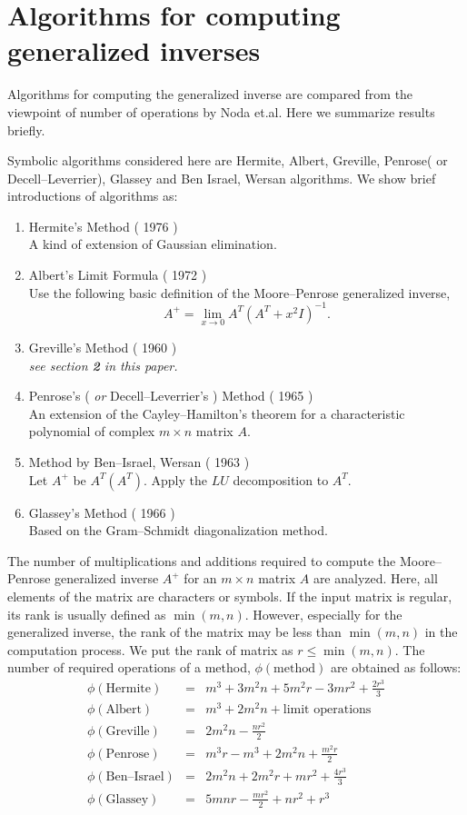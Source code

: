 \section{Algorithms for computing generalized inverses}

Algorithms for computing the generalized inverse 
are compared from the viewpoint of number of 
operations by Noda et.al. \cite{No89,MS95}  
Here we summarize results briefly.  \par
Symbolic algorithms considered here are Hermite, 
Albert, Greville, Penrose( or Decell--Leverrier), 
Glassey and Ben Israel, Wersan algorithms.  
We show brief introductions of algorithms as:
\begin{enumerate}
\item Hermite's Method ( 1976 ) \\
A kind of extension of Gaussian elimination.
\item Albert's Limit Formula ( 1972 ) \\
Use the following basic definition of the 
Moore--Penrose generalized inverse, 
$$ A^+ = \lim_{x \rightarrow 0} A^T 
( A^T + x^2 I )^{-1} . $$
\item Greville's Method ( 1960 ) \\
{\it see section \mbox{\bf 2} in this paper.}
\item Penrose's ( {\it or } Decell--Leverrier's ) 
Method ( 1965 ) \\
An extension of the Cayley--Hamilton's 
theorem for a characteristic polynomial of complex 
$m \times n $ matrix $A $.
\item Method by Ben--Israel, Wersan ( 1963 ) \\
Let $A^+ $ be $A^T ( A^T ) $.  Apply the $L U $ 
decomposition to $A^T $.
\item Glassey's Method ( 1966 ) \\
Based on the Gram--Schmidt diagonalization method.  
\end{enumerate}
The number of multiplications and additions required 
to compute the Moore--Penrose generalized inverse 
$A^+ $ for an $m \times n $ matrix $A $ are 
analyzed.  Here, all elements of the matrix are 
characters or symbols.  If the input matrix is 
regular, its rank is usually defined as 
$\min(m,n) $.  However, especially for the 
generalized inverse, the rank of the matrix may be less 
than $\min(m,n) $ in the computation process.  We 
put the rank of matrix as $r \leq \min(m,n) $.  The 
number of required operations of a method, 
$\phi(\mbox{method}) $ are obtained as follows:
\begin{eqnarray*}
\phi(\mbox{Hermite}) &=& m^3+3m^2n+5m^2r-3mr^2+\frac{2r^3}{3}
\\\phi(\mbox{Albert}) &=& m^3+2m^2n+\mbox{limit operations}
\\\phi(\mbox{Greville}) &=& 2m^2n-\frac{nr^2}{2} \\
\phi(\mbox{Penrose}) &=& m^3r-m^3+2m^2n+\frac{m^2r}{2}
\\\phi(\mbox{Ben--Israel}) &=& 2m^2n+2m^2r+mr^2+\frac{4r^3}{3}
\\\phi(\mbox{Glassey}) &=& 5mnr-\frac{mr^2}{2}+nr^2+r^3
\end{eqnarray*}
